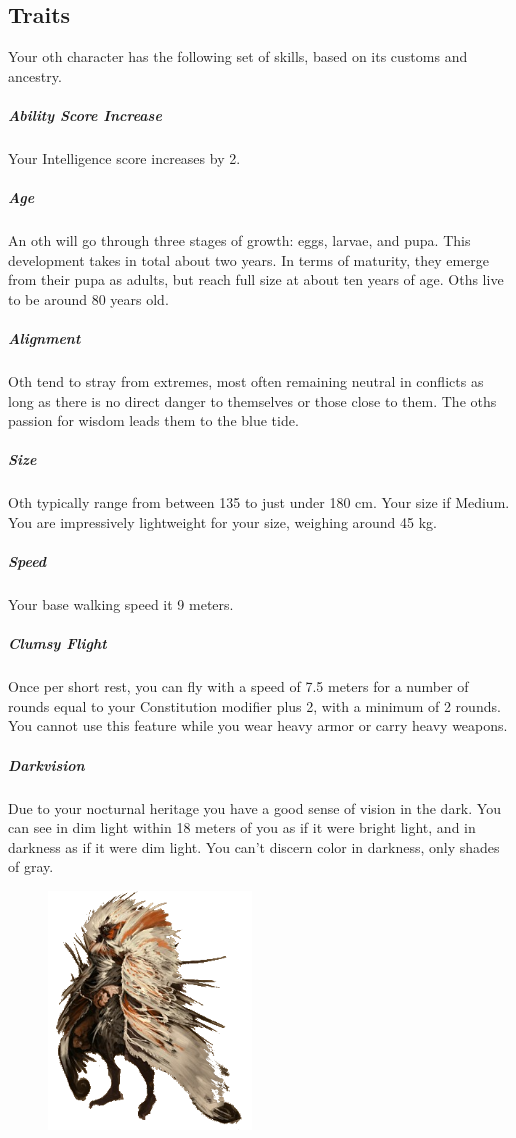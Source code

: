 \begin{linenumbers}
\subsection*{Traits}
Your oth character has the following set of skills, based on its customs and ancestry.

\subparagraph{Ability Score Increase} Your Intelligence score increases by 2.

\subparagraph{Age} An oth will go through three stages of growth: eggs, larvae, and pupa.
This development takes in total about two years.
In terms of maturity, they emerge from their pupa as adults, but reach full size at about ten years of age.
Oths live to be around 80 years old.

\subparagraph{Alignment} Oth tend to stray from extremes, most often remaining neutral in conflicts as long as there is no direct danger to themselves or those close to them.
The oths passion for wisdom leads them to the blue tide.

\subparagraph{Size} Oth typically range from between 135 to just under 180 cm.
Your size if Medium.
You are impressively lightweight for your size, weighing around 45 kg.

\subparagraph{Speed} Your base walking speed it 9 meters.

\subparagraph{Clumsy Flight} Once per short rest, you can fly with a speed of 7.5 meters for a number of rounds equal to your Constitution modifier plus 2, with a minimum of 2 rounds.
You cannot use this feature while you wear heavy armor or carry heavy weapons.

\subparagraph{Darkvision} Due to your nocturnal heritage you have a good sense of vision in the dark.
You can see in dim light within 18 meters of you as if it were bright light, and in darkness as if it were dim light.
You can't discern color in darkness, only shades of gray.

\begin{figure}[!t]
    \centering
    \includegraphics[width=0.48\textwidth]{02kins/img/14oth_white.png}
\end{figure}


\end{linenumbers}
